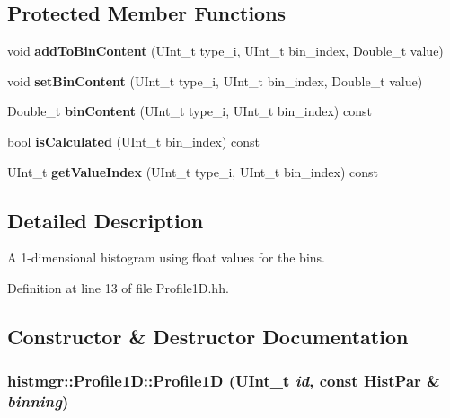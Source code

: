\subsection*{Protected Member Functions}
\begin{DoxyCompactItemize}
\item 
void {\bfseries addToBinContent} (UInt\_\-t type\_\-i, UInt\_\-t bin\_\-index, Double\_\-t value)\label{classhistmgr_1_1Profile1D_aadc85fd4d567c7eb28a7b4da4741ebc4}

\item 
void {\bfseries setBinContent} (UInt\_\-t type\_\-i, UInt\_\-t bin\_\-index, Double\_\-t value)\label{classhistmgr_1_1Profile1D_a7a35e0ae5777ff5f9b96c7cd19c68a23}

\item 
Double\_\-t {\bfseries binContent} (UInt\_\-t type\_\-i, UInt\_\-t bin\_\-index) const \label{classhistmgr_1_1Profile1D_a25ff38a444a39ce2105c287e0acf3955}

\item 
bool {\bfseries isCalculated} (UInt\_\-t bin\_\-index) const \label{classhistmgr_1_1Profile1D_affb2a5a6c6de2b2629ba827fff24876c}

\item 
UInt\_\-t {\bfseries getValueIndex} (UInt\_\-t type\_\-i, UInt\_\-t bin\_\-index) const \label{classhistmgr_1_1Profile1D_a27b869379f7ac5024adadf2c3a6ff848}

\end{DoxyCompactItemize}


\subsection{Detailed Description}
A 1-\/dimensional histogram using float values for the bins. 

Definition at line 13 of file Profile1D.hh.

\subsection{Constructor \& Destructor Documentation}
\subsubsection[{Profile1D}]{\setlength{\rightskip}{0pt plus 5cm}histmgr::Profile1D::Profile1D (UInt\_\-t {\em id}, \/  const {\bf HistPar} \& {\em binning})}\label{classhistmgr_1_1Profile1D_a89f879d24c7404f5ac2514baa2038a54}



